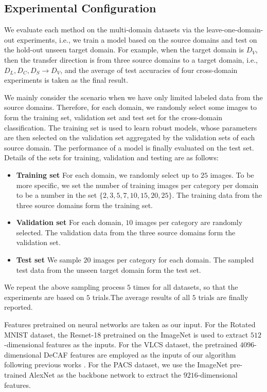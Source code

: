 \documentclass[journal]{IEEEtran}
\begin{document}
\subsection{Experimental Configuration}
We evaluate each method on the multi-domain datasets via the leave-one-domain-out experiments,
i.e., we train a model based on the source domains and test on the hold-out unseen target domain.
For example, when the target domain is $D_V$, then the transfer direction is from three source domains to a target domain, i.e., $D_L, D_C, D_S\rightarrow D_V$, and the average of test accuracies of four cross-domain experiments is taken as the final result.

We mainly consider the scenario when we have only limited labeled data from the source domains.
Therefore, for each domain, we randomly select some images to form the training set, validation set and test set for the cross-domain classification. 
The training set is used to learn robust models, whose
parameters are then selected on the validation set aggregated by the validation sets of each source domain.
The performance of a model is finally evaluated on the test set.
Details of the sets for training, validation and testing are as follows:
\begin{itemize}
    \item \textbf{Training set} For each domain, we randomly select up to $25$ images. To be more specific, we set the number of training images per category per domain to be a number in the set $\{2,3,5,7,10, 15, 20, 25\}$. 
    The training data from the three source domains form the training set.
    \item \textbf{Validation set} For each domain, $10$ images per category are randomly selected. The validation data from the three source domains form the validation set.
    \item \textbf{Test set} We sample $20$ images per category for each domain. The sampled test data from the unseen target domain form the test set.   
\end{itemize}
We repeat the above sampling process $5$ times for all datasets, so that the experiments are based on $5$ trials.The average results of all $5$ trials are finally reported.


Features pretrained on neural networks are taken as our input.
For the Rotated MNIST dataset, the Resnet-18 \cite{he2016deep} pretrained on the ImageNet is used to extract $512$-dimensional features as the inputs.
For the VLCS dataset, the pretrained $4096$-dimensional DeCAF features \cite{donahue2014decaf} are employed as the inputs of our algorithm following previous works \cite{motiian2017unified, dou2019domain}.
For the PACS dataset, we use the ImageNet pre-trained AlexNet \cite{krizhevsky2012imagenet} as the backbone network to extract the $9216$-dimensional features. 
\end{document}

